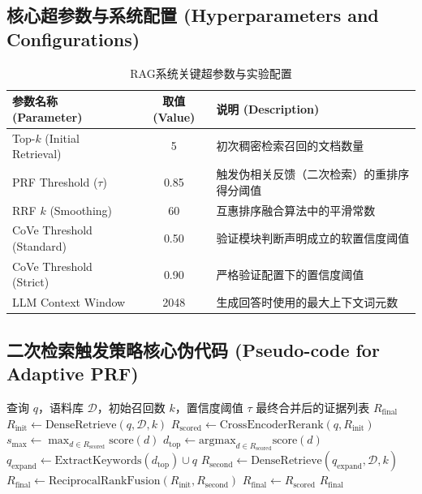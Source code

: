 {

    \appendixsubsecmajornumbering

    \subsection{核心超参数与系统配置 (Hyperparameters and Configurations)}

    \begin{table}[!htbp]
    \centering
    \caption{RAG系统关键超参数与实验配置}
    \label{tab:hyperparameters}
    \small
    \begin{tabularx}{\linewidth}{|l|c|X|}
    \hline
    \textbf{参数名称 (Parameter)} & \textbf{取值 (Value)} & \textbf{说明 (Description)} \\
    \hline
    Top-$k$ (Initial Retrieval) & 5 & 初次稠密检索召回的文档数量 \\
    \hline
    PRF Threshold ($\tau$) & 0.85 & 触发伪相关反馈（二次检索）的重排序得分阈值 \\
    \hline
    RRF $k$ (Smoothing) & 60 & 互惠排序融合算法中的平滑常数 \\
    \hline
    CoVe Threshold (Standard) & 0.50 & 验证模块判断声明成立的软置信度阈值 \\
    \hline
    CoVe Threshold (Strict) & 0.90 & 严格验证配置下的置信度阈值 \\
    \hline
    LLM Context Window & 2048 & 生成回答时使用的最大上下文词元数 \\
    \hline
    \end{tabularx}
    \end{table}

    \subsection{二次检索触发策略核心伪代码 (Pseudo-code for Adaptive PRF)}

    \begin{algorithm}[!htbp]
    \renewcommand{\algorithmicrequire}{\textbf{输入:}}
    \renewcommand{\algorithmicensure}{\textbf{输出:}}
    \caption{基于置信度的二次检索触发与融合策略}
    \begin{algorithmic}[1]
    \REQUIRE 查询 $q$，语料库 $\mathcal{D}$，初始召回数 $k$，置信度阈值 $\tau$
    \ENSURE 最终合并后的证据列表 $R_{\text{final}}$
    \STATE $R_{\text{init}} \leftarrow \text{DenseRetrieve}(q, \mathcal{D}, k)$
    \STATE $R_{\text{scored}} \leftarrow \text{CrossEncoderRerank}(q, R_{\text{init}})$
    \STATE $s_{\text{max}} \leftarrow \max_{d \in R_{\text{scored}}} \text{score}(d)$
        \STATE $d_{\text{top}} \leftarrow \text{argmax}_{d \in R_{\text{scored}}} \text{score}(d)$
        \STATE $q_{\text{expand}} \leftarrow \text{ExtractKeywords}(d_{\text{top}}) \cup q$
        \STATE $R_{\text{second}} \leftarrow \text{DenseRetrieve}(q_{\text{expand}}, \mathcal{D}, k)$
        \STATE $R_{\text{final}} \leftarrow \text{ReciprocalRankFusion}(R_{\text{init}}, R_{\text{second}})$
    \ELSE
        \STATE $R_{\text{final}} \leftarrow R_{\text{scored}}$
    \ENDIF
    \RETURN $R_{\text{final}}$
    \end{algorithmic}
    \end{algorithm}

    \removeappendixsubsecmajornumbering
}